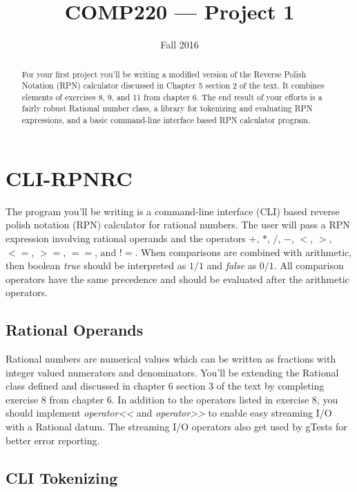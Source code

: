 \documentclass[10pt]{article}
\title{COMP220 --- Project 1}
\author{ }
\date{Fall 2016}
\begin{document}
\maketitle
\thispagestyle{empty}

\begin{abstract}
For your first project you'll be writing a modified version of the Reverse Polish Notation (RPN) calculator discussed in Chapter 5 section 2 of the text.  It combines elements of exercises 8, 9, and 11 from chapter 6.  The end result of your efforts is a fairly robust Rational number class, a library for tokenizing and evaluating RPN expressions, and a basic command-line interface based RPN calculator program.
\end{abstract}

\section*{CLI-RPNRC}

The program you'll be writing is a command-line interface (CLI) based reverse polish notation (RPN) calculator for rational numbers. The user will pass a RPN expression involving rational operands and the operators $+$, $*$, $/$, $-$, $<$, $>$, $<=$, $>=$, $==$, and $!=$.  When comparisons are combined with arithmetic, then boolean \textit{true} should be interpreted as $1/1$ and \textit{false} as $0/1$. All comparison operators have the same precedence and should be evaluated after the arithmetic operators.

\subsection*{Rational Operands}

Rational numbers are numerical values which can be written as fractions with integer valued numerators and denominators. You'll be extending the Rational class defined and discussed in chapter 6 section 3 of the text by completing exercise 8 from chapter 6. In addition to the operators listed in exercise 8, you should implement \textit{operator<<} and \textit{operator>>} to enable easy streaming I/O with a Rational datum.  The streaming I/O operators also get used by gTests for better error reporting.

\subsection*{CLI Tokenizing}
\end{document}
